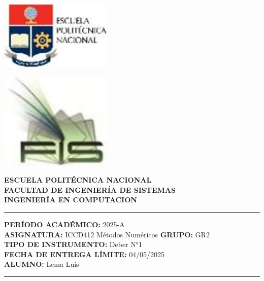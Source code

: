 \documentclass[12pt]{article}
\begin{document}
\begin{minipage}{0.45\textwidth}
    \includegraphics[width=0.4\textwidth]{inFiles/Figures/epnLogo.jpg}
\end{minipage}
\hfill
\begin{minipage}{0.45\textwidth}
    \raggedleft
    \includegraphics[width=0.4\textwidth]{inFiles/Figures/FIS_logo.jpg}
\end{minipage}

\vspace{0.5cm}

\begin{center}
    \textbf{ESCUELA POLITÉCNICA NACIONAL}\\[0.2cm]
    \textbf{FACULTAD DE INGENIERÍA DE SISTEMAS}\\[0.2cm]
    \textbf{INGENIERÍA {\textbf{EN COMPUTACION}}}
\end{center}

\vspace{0.5cm}
\hrule
\vspace{0.5cm}

\noindent\textbf{PERÍODO ACADÉMICO:} 2025-A\\[0.2cm]
\noindent\textbf{ASIGNATURA:} ICCD412 Métodos Numéricos \hfill \textbf{GRUPO:} GR2\\[0.2cm]
\noindent\textbf{TIPO DE INSTRUMENTO:} {Deber N°1}\\[0.2cm]
\noindent\textbf{FECHA DE ENTREGA LÍMITE:} {04/05/2025}\\[0.2cm]
\noindent\textbf{ALUMNO:} {Lema Luis}

\vspace{0.5cm}
\hrule
\vspace{1cm}
\end{document}
